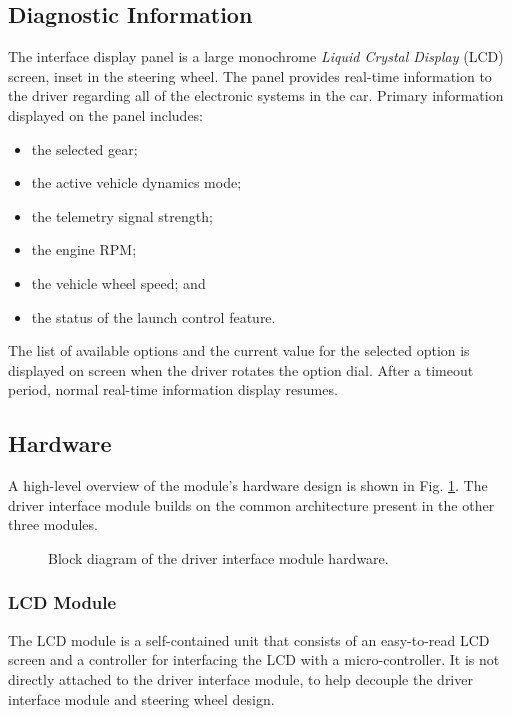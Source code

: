 \subsection{Diagnostic Information}
\label{sec:interface_diag}

The interface display panel is a large monochrome \emph{Liquid Crystal Display} (LCD) screen, inset in the steering wheel. The panel provides real-time information to the driver regarding all of the electronic systems in the car. Primary information displayed on the panel includes:

\begin{itemize}
\item the selected gear;
\item the active vehicle dynamics mode;
\item the telemetry signal strength;
\item the engine RPM;
\item the vehicle wheel speed; and
\item the status of the launch control feature.
\end{itemize}

The list of available options and the current value for the selected option is displayed on screen when the driver rotates the option dial. After a timeout period, normal real-time information display resumes. 

\subsection{Hardware}

A high-level overview of the module's hardware design is shown in Fig. \ref{fig:interface_hardware_design_block}. The driver interface module builds on the common architecture present in the other three modules. 

\begin{figure}[H]
\centering

\caption{Block diagram of the driver interface module hardware.}
\label{fig:interface_hardware_design_block}
\end{figure}

\subsubsection{LCD Module}

The LCD module is a self-contained unit that consists of an easy-to-read LCD screen and a controller for interfacing the LCD with a micro-controller. It is not directly attached to the driver interface module, to help decouple the driver interface module and steering wheel design.

